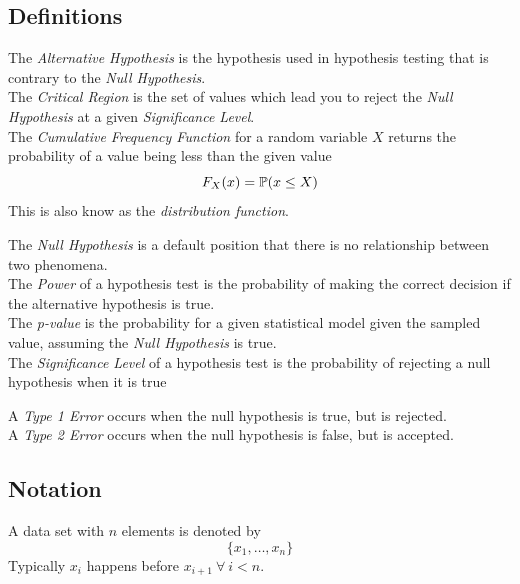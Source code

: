 \documentclass[11pt,a4paper]{article}
\begin{document}
\subsection{Definitions}

The \textit{Alternative Hypothesis} is the hypothesis used in hypothesis testing that is contrary to the \textit{Null Hypothesis}.\\

The \textit{Critical Region} is the set of values which lead you to reject the \textit{Null Hypothesis} at a given \textit{Significance Level}.\\

The \textit{Cumulative Frequency Function} for a random variable $X$ returns the probability of a value being less than the given value
$$F_X(x)=\mathbb{P}(x\leq X)$$
\nb This is also know as the \textit{distribution function}.

The \textit{Null Hypothesis} is a default position that there is no relationship between two phenomena.\\

The \textit{Power} of a hypothesis test is the probability of making the correct decision if the alternative hypothesis is true.\\

The \textit{p-value} is the probability for a given statistical model given the sampled value, assuming the \textit{Null Hypothesis} is true.\\

The \textit{Significance Level} of a hypothesis test is the probability of rejecting a null hypothesis when it is true

A \textit{Type 1 Error} occurs when the null hypothesis is true, but is rejected.\\

A \textit{Type 2 Error} occurs when the null hypothesis is false, but is accepted.\\

\subsection{Notation}

A data set with $n$ elements is denoted by
$$\{x_1,\dots,x_n\}$$
Typically $x_i$ happens before $x_{i+1}\ \forall\ i<n$.\\
\end{document}
